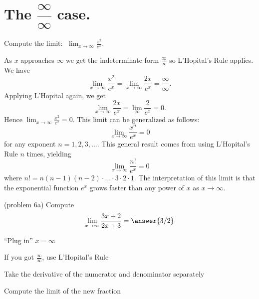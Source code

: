 \documentclass{ximera}
\begin{document}
\section{ The $\dfrac{\infty}{\infty}$ case.}



\begin{example}[example 6]
Compute the limit:  $\displaystyle{\;\lim_{x \to \infty} \frac{x^2}{e^x}}.$

As $x$ approaches $\infty$ we get the indeterminate form $\frac{\infty}{\infty}$ so L'Hopital's Rule applies.
We have 
\[\lim_{x\to \infty} \frac{x^2}{e^x} = \lim_{x \to \infty} \frac{2x}{e^x} = \frac{\infty}{\infty}.\]
Applying L'Hopital again, we get
\[\lim_{x \to \infty} \frac{2x}{e^x} = \lim_{\infty} \frac{2}{e^x} = 0.\]
Hence $\lim_{x\to\infty}\frac{x^2}{e^x}=0$.  
This limit can be generalized as follows:
\[\lim_{x\to\infty}\frac{x^n}{e^x} =0\]
for any exponent $n = 1, 2, 3, \dots$.
This general result comes from using L'Hopital's Rule $n$ times, yielding
\[\lim_{x\to\infty} \frac{n!}{e^x} =0\]
where $n! = n(n-1)(n-2)\cdot \dots \cdot 3\cdot 2\cdot 1$.
The interpretation of this limit is that the exponential function $e^x$ grows faster than any power of $x$ as $x \to \infty$.
\end{example}




\begin{problem}(problem 6a)
  Compute
  \[
  \lim_{x \to \infty} \frac{3x+2}{2x + 3} = \answer{3/2}
  \]
  
    \begin{hint}
      ``Plug in'' $x=\infty$
    \end{hint}
    \begin{hint}
      If you got $\frac{\infty}{\infty}$, use L'Hopital's Rule
    \end{hint}
    \begin{hint}
      Take the derivative of the numerator and denominator separately
    \end{hint}
		\begin{hint}
      Compute the limit of the new fraction
    \end{hint}
	
\end{problem}
\end{document}
